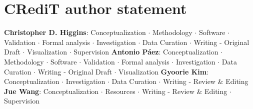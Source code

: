 \documentclass[]{elsarticle} %
\begin{document}
\hypertarget{credit-author-statement}{%
\section{CRediT author statement}\label{credit-author-statement}}

\textbf{Christopher D. Higgins}: Conceptualization \(\cdot\) Methodology
\(\cdot\) Software \(\cdot\) Validation \(\cdot\) Formal analysis
\(\cdot\) Investigation \(\cdot\) Data Curation \(\cdot\) Writing -
Original Draft \(\cdot\) Visualization \(\cdot\) Supervision
\textbf{Antonio Páez}: Conceptualization \(\cdot\) Methodology \(\cdot\)
Software \(\cdot\) Validation \(\cdot\) Formal analysis \(\cdot\)
Investigation \(\cdot\) Data Curation \(\cdot\) Writing - Original Draft
\(\cdot\) Visualization \textbf{Gyoorie Kim}: Conceptualization
\(\cdot\) Investigation \(\cdot\) Data Curation \(\cdot\) Writing -
Review \& Editing \textbf{Jue Wang}: Conceptualization \(\cdot\)
Resources \(\cdot\) Writing - Review \& Editing \(\cdot\) Supervision
\end{document}
